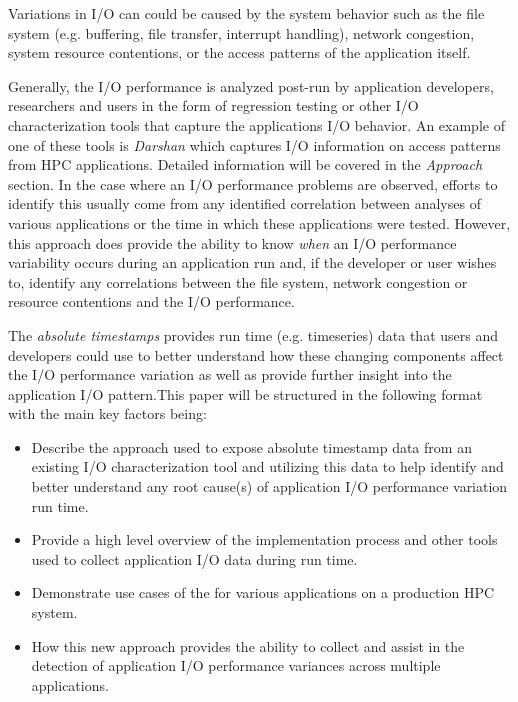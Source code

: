 \documentclass[conference]{IEEEtran}
\begin{document}
Variations in I/O can could be caused by the system behavior such as the file system (e.g. buffering, file transfer, interrupt handling), network congestion, system resource contentions, or the access patterns of the application itself.

Generally, the I/O performance is analyzed post-run by application developers, researchers and users in the form of regression testing or other I/O characterization tools that capture the applications I/O behavior. An example of one of these tools is \emph{Darshan} which captures I/O information on access patterns from HPC applications. Detailed information will be covered in the \emph{Approach} section. In the case where an I/O performance problems are observed, efforts to identify this usually come from any identified correlation between analyses of various applications or the time in which these applications were tested. However, this approach does provide the ability to know \emph{when} an I/O performance variability occurs during an application run and, if the developer or user wishes to, identify any correlations between the file system, network congestion or resource contentions and the I/O performance.


The \emph{absolute timestamps} provides run time (e.g. timeseries) data that users and developers could use to better understand how these changing components affect the I/O performance variation as well as provide further insight into the application I/O pattern.This paper will be structured in the following format with the main key factors being:
\begin{itemize}
    \item Describe the approach used to expose absolute timestamp data from an existing I/O characterization tool and utilizing this data to help identify and better understand any root cause(s) of application I/O performance variation run time.
    \item Provide a high level overview of the implementation process and other tools used to collect application I/O data during run time.
    \item Demonstrate use cases of the \connector for various applications on a production HPC system. 
    \item How this new approach provides the ability to collect and assist in the detection of application I/O performance variances across multiple applications. 
\end{itemize}
\end{document}
